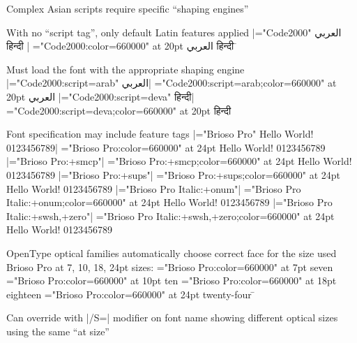 \item Complex Asian scripts require specific “shaping engines”
\item With no “script tag”, only default Latin features applied
\vadjust{\medskip}\hfil\break |\font\x="Code2000" \x العربي हिन्दी |\hfil\break\indent
{\font\x="Code2000:color=660000" at 20pt \x العربي हिन्दी}
\=
\medskip
\item Must load the font with the appropriate shaping engine
\vadjust{\medskip}\hfil\break |\font\x="Code2000:script=arab" \x العربي|\hfil\break\indent
{\font\x="Code2000:script=arab;color=660000" at 20pt \x العربي}
\vadjust{\bigskip}
\hfil\break |\font\x="Code2000:script=deva" \x हिन्दी|\hfil\break\indent
{\font\x="Code2000:script=deva;color=660000" at 20pt \x हिन्दी}

\item Font specification may include feature tags
\subitem |\font\x="Brioso Pro" \x Hello World! 0123456789|\hfil\break\indent
{\font\x="Brioso Pro:color=660000" at 24pt \x Hello World! 0123456789}
\subitem |\font\x="Brioso Pro:+smcp"|\hfil\break\indent
{\font\x="Brioso Pro:+smcp;color=660000" at 24pt \x Hello World! 0123456789}
\subitem |\font\x="Brioso Pro:+sups"|\hfil\break\indent
{\font\x="Brioso Pro:+sups;color=660000" at 24pt \x Hello World! 0123456789}
\subitem |\font\x="Brioso Pro Italic:+onum"|\hfil\break\indent
{\font\x="Brioso Pro Italic:+onum;color=660000" at 24pt \x Hello World! 0123456789}
\subitem |\font\x="Brioso Pro Italic:+swsh,+zero"|\hfil\break\indent
{\font\x="Brioso Pro Italic:+swsh,+zero;color=660000" at 24pt \x Hello World! 0123456789}


\item OpenType optical families automatically choose correct face for the size used
\subitem Brioso Pro at 7, 10, 18, 24pt sizes:\hfil\break
{\font\x="Brioso Pro:color=660000" at 7pt \x seven}
{\font\x="Brioso Pro:color=660000" at 10pt \x ten}
{\font\x="Brioso Pro:color=660000" at 18pt \x eighteen}
{\font\x="Brioso Pro:color=660000" at 24pt \x twenty-four}
\=
\item Can override with |/S=| modifier on font name
\subitem showing different optical sizes using the same “at size”

